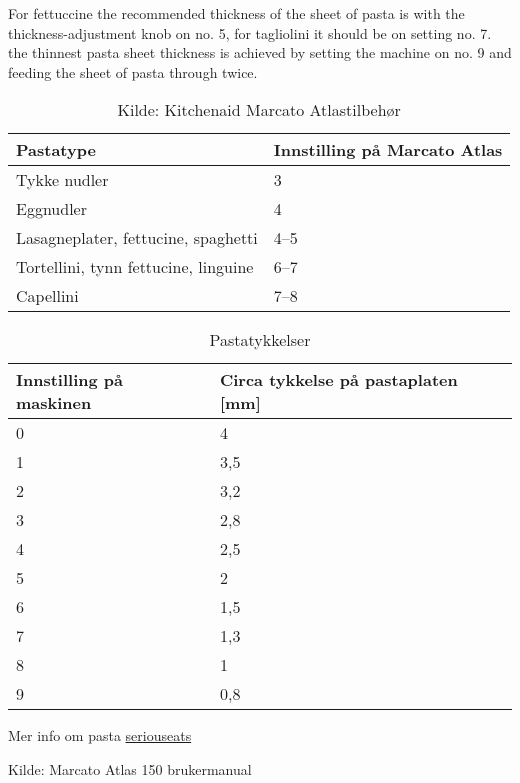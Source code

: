 For fettuccine the recommended thickness of the sheet of pasta is with the  thickness-adjustment knob on no. 5, for tagliolini it should
be on setting no. 7.
the thinnest pasta sheet thickness is achieved by setting the machine
on no. 9 and feeding the sheet of pasta through twice.\\


\begin{table}[]
\centering
\begin{tabular}{ll}
\toprule
Pastatype                            & Innstilling på Marcato Atlas \\ \midrule
Tykke nudler                         & 3                            \\
Eggnudler                            & 4                            \\
Lasagneplater, fettucine, spaghetti  & 4--5                         \\
Tortellini, tynn fettucine, linguine & 6--7                         \\
Capellini                            & 7--8                         \\ \bottomrule
\end{tabular}
\caption{Kilde: Kitchenaid Marcato Atlastilbehør}
\label{pastatyper}
\end{table}


\begin{table}[]
\centering
\begin{tabular}{ll}
\toprule
Innstilling på maskinen & Circa tykkelse på pastaplaten [mm] \\ \midrule
0                       & 4                                              \\
1                       & 3,5                                            \\
2                       & 3,2                                            \\
3                       & 2,8                                            \\
4                       & 2,5                                            \\
5                       & 2                                              \\
6                       & 1,5                                            \\
7                       & 1,3                                            \\
8                       & 1                                              \\
9                       & 0,8                                            \\ \bottomrule
\end{tabular}
\caption{Pastatykkelser}
\label{pastatykkelser}
\end{table}

Mer info om pasta \href{http://www.seriouseats.com/recipes/2015/03/uovo-in-raviolo-runny-egg-yolk-ravioli-ricotta-recipe.html}{seriouseats}

Kilde: Marcato Atlas 150 brukermanual
